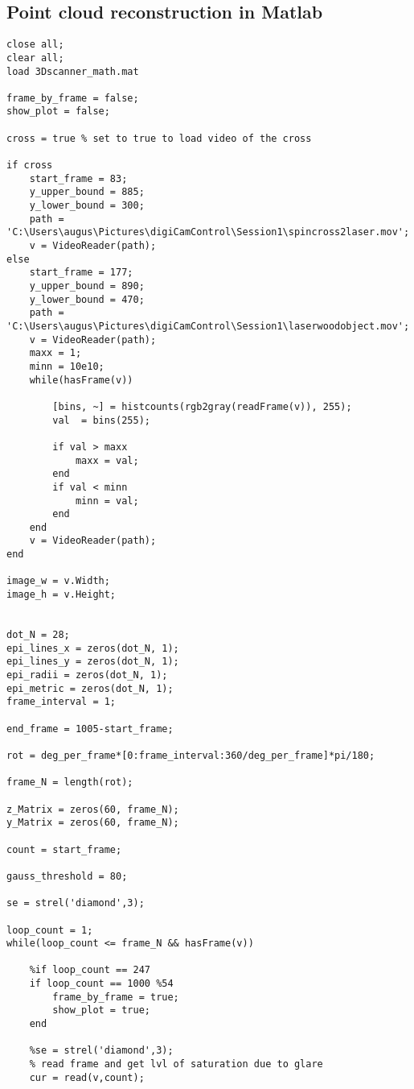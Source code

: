 \begin{appendices}
\section{Point cloud reconstruction in Matlab}\label{appendix:pointcloudcode}

\begin{verbatim}
close all;
clear all;
load 3Dscanner_math.mat

frame_by_frame = false;
show_plot = false;

cross = true % set to true to load video of the cross

if cross
    start_frame = 83;
    y_upper_bound = 885;
    y_lower_bound = 300;
    path = 'C:\Users\augus\Pictures\digiCamControl\Session1\spincross2laser.mov';
    v = VideoReader(path);
else
    start_frame = 177;
    y_upper_bound = 890;
    y_lower_bound = 470;
    path = 'C:\Users\augus\Pictures\digiCamControl\Session1\laserwoodobject.mov';
    v = VideoReader(path);
    maxx = 1;
    minn = 10e10;
    while(hasFrame(v))

        [bins, ~] = histcounts(rgb2gray(readFrame(v)), 255);
        val  = bins(255);

        if val > maxx
            maxx = val;
        end
        if val < minn 
            minn = val;
        end
    end
    v = VideoReader(path);
end

image_w = v.Width;
image_h = v.Height;


dot_N = 28;
epi_lines_x = zeros(dot_N, 1);
epi_lines_y = zeros(dot_N, 1);
epi_radii = zeros(dot_N, 1);
epi_metric = zeros(dot_N, 1);
frame_interval = 1;

end_frame = 1005-start_frame;

rot = deg_per_frame*[0:frame_interval:360/deg_per_frame]*pi/180;

frame_N = length(rot);

z_Matrix = zeros(60, frame_N); 
y_Matrix = zeros(60, frame_N); 

count = start_frame;

gauss_threshold = 80;

se = strel('diamond',3);

loop_count = 1;
while(loop_count <= frame_N && hasFrame(v))
    
    %if loop_count == 247
    if loop_count == 1000 %54 
        frame_by_frame = true;
        show_plot = true;
    end
    
    %se = strel('diamond',3);
    % read frame and get lvl of saturation due to glare
    cur = read(v,count);
    

\end{verbatim}
\end{appendices}

